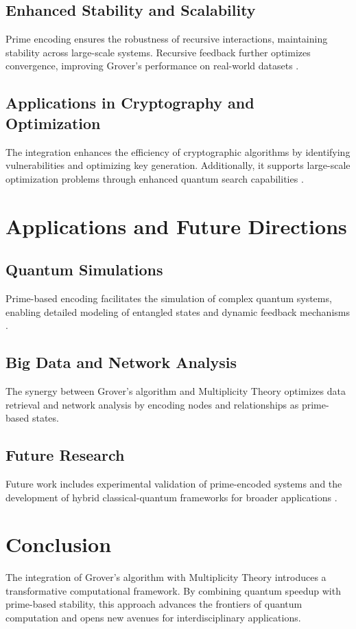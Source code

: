 \documentclass{article}
\theoremstyle{plain}
\begin{document}
\subsection{Enhanced Stability and Scalability}
Prime encoding ensures the robustness of recursive interactions, maintaining stability across large-scale systems. Recursive feedback further optimizes convergence, improving Grover's performance on real-world datasets \cite{niven1991, childs2010}.

\subsection{Applications in Cryptography and Optimization}
The integration enhances the efficiency of cryptographic algorithms by identifying vulnerabilities and optimizing key generation. Additionally, it supports large-scale optimization problems through enhanced quantum search capabilities \cite{shor1994, ricks2004}.

\section{Applications and Future Directions}
\subsection{Quantum Simulations}
Prime-based encoding facilitates the simulation of complex quantum systems, enabling detailed modeling of entangled states and dynamic feedback mechanisms \cite{berkowitz2021, ricks2004}.

\subsection{Big Data and Network Analysis}
The synergy between Grover's algorithm and Multiplicity Theory optimizes data retrieval and network analysis by encoding nodes and relationships as prime-based states.

\subsection{Future Research}
Future work includes experimental validation of prime-encoded systems and the development of hybrid classical-quantum frameworks for broader applications \cite{niven1991, hardy1916}.

\section{Conclusion}
The integration of Grover's algorithm with Multiplicity Theory introduces a transformative computational framework. By combining quantum speedup with prime-based stability, this approach advances the frontiers of quantum computation and opens new avenues for interdisciplinary applications.



\end{document}
